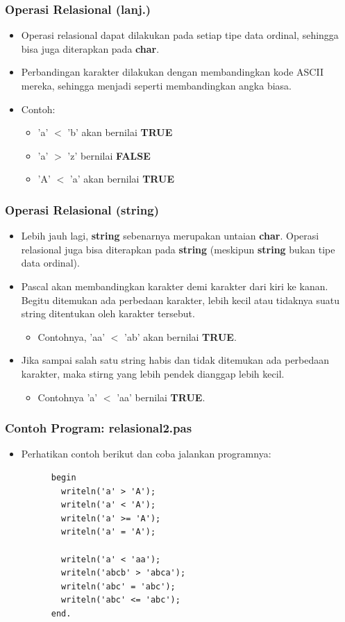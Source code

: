 \begin{frame}
\frametitle{Operasi Relasional (lanj.)}
\begin{itemize}
  \item Operasi relasional dapat dilakukan pada setiap tipe data ordinal, sehingga bisa juga diterapkan pada \textbf{char}.
  \item Perbandingan karakter dilakukan dengan membandingkan kode ASCII mereka, sehingga menjadi seperti membandingkan angka biasa.
  \item Contoh:
  \begin{itemize}
    \item 'a' $<$ 'b' akan bernilai \textbf{TRUE}
    \item 'a' $>$ 'z' bernilai \textbf{FALSE}
    \item 'A' $<$ 'a' akan bernilai \textbf{TRUE}
  \end{itemize}
\end{itemize}
\end{frame}

\begin{frame}
\frametitle{Operasi Relasional (string)}
\begin{itemize}
  \item Lebih jauh lagi, \textbf{string} sebenarnya merupakan untaian \textbf{char}. Operasi relasional juga bisa diterapkan pada \textbf{string} (meskipun \textbf{string} bukan tipe data ordinal).
  \item Pascal akan membandingkan karakter demi karakter dari kiri ke kanan. Begitu ditemukan ada perbedaan karakter, lebih kecil atau tidaknya suatu string ditentukan oleh karakter tersebut.
  \begin{itemize}
    \item Contohnya, 'aa' $<$ 'ab' akan bernilai \textbf{TRUE}.
  \end{itemize}
  \item Jika sampai salah satu string habis dan tidak ditemukan ada perbedaan karakter, maka stirng yang lebih pendek dianggap lebih kecil.
  \begin{itemize}
    \item Contohnya 'a' $<$ 'aa' bernilai \textbf{TRUE}.
  \end{itemize}
\end{itemize}
\end{frame}

\begin{frame}[fragile]
\frametitle{Contoh Program: relasional2.pas}
\begin{itemize}
  \item Perhatikan contoh berikut dan coba jalankan programnya:
    \begin{lstlisting}
      begin
        writeln('a' > 'A');
        writeln('a' < 'A');
        writeln('a' >= 'A');
        writeln('a' = 'A');

        writeln('a' < 'aa');
        writeln('abcb' > 'abca');
        writeln('abc' = 'abc');
        writeln('abc' <= 'abc');
      end.
    \end{lstlisting}
\end{itemize}
\end{frame}

